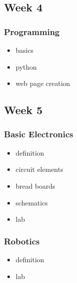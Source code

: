 \documentclass[11pt]{article}
\begin{document}
\subsection*{Week 4}

\subsubsection*{Programming}

\begin{itemize}\itemsep.5pt
\item basics
\item python
\item web page creation
\end{itemize}

\subsection*{Week 5}

\subsubsection*{Basic Electronics}

\begin{itemize}\itemsep.5pt
\item definition
\item circuit elements
\item bread boards
\item schematics
\item lab
\end{itemize}

\subsubsection*{Robotics}

\begin{itemize}\itemsep.5pt
\item definition
\item lab
\end{itemize}
\end{document}
